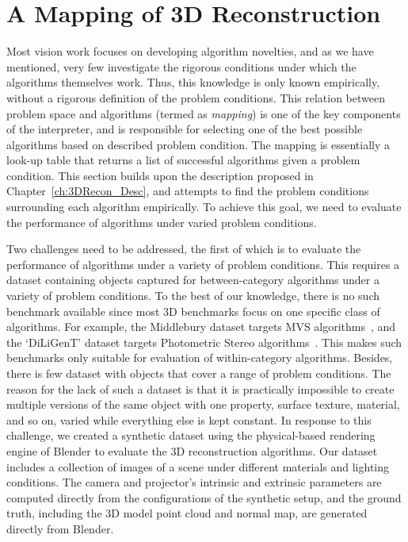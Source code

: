 
\chapter{A Mapping of 3D Reconstruction}
\label{ch:3DRecon_Mapping}
Most vision work focuses on developing algorithm novelties, and as we have mentioned, very few investigate the rigorous conditions under which the algorithms themselves work. Thus, this knowledge is only known empirically, without a rigorous definition of the problem conditions. This relation between problem space and algorithms (termed as \textit{mapping}) is one of the key components of the interpreter, and is responsible for selecting one of the best possible algorithms based on described problem condition. The mapping is essentially a look-up table that returns a list of successful algorithms given a problem condition. This section builds upon the description proposed in Chapter~\ref{ch:3DRecon_Desc}, and attempts to find the problem conditions surrounding each algorithm empirically. To achieve this goal, we need to evaluate the performance of algorithms under varied problem conditions.

Two challenges need to be addressed, the first of which is to evaluate the performance of algorithms under a variety of problem conditions. This requires a dataset containing objects captured for between-category algorithms under a variety of problem conditions. To the best of our knowledge, there is no such benchmark available since most 3D benchmarks focus on one specific class of algorithms. For example, the Middlebury dataset targets MVS algorithms~\cite{seitz2006comparison}, and the `DiLiGenT' dataset targets Photometric Stereo algorithms~\cite{shi2016benchmark}. This makes such benchmarks only suitable for evaluation of within-category algorithms. Besides, there is few dataset with objects that cover a range of problem conditions. The reason for the lack of such a dataset is that it is practically impossible to create multiple versions of the same object with one property, \eg surface texture, material, and so on, varied while everything else is kept constant. In response to this challenge, we created a synthetic dataset using the physical-based rendering engine of Blender to evaluate the 3D reconstruction algorithms. Our dataset includes a collection of images of a scene under different materials and lighting conditions. The camera and projector's intrinsic and extrinsic parameters are computed directly from the configurations of the synthetic setup, and the ground truth, including the 3D model point cloud and normal map, are generated directly from Blender.

